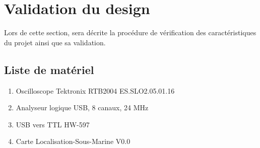 \section{Validation du design}
Lors de cette section, sera décrite la procédure de vérification des caractéristiques du projet ainsi que sa validation.
\subsection{Liste de matériel} \label{ssec:ListeMateriel}
{
	\begin{enumerate}
		\item Oscilloscope Tektronix RTB2004 ES.SLO2.05.01.16 \label{enum:oscillo}
		\item Analyseur logique USB, 8 canaux, 24 MHz \label{enum:logicAnalyzer}
		\item USB vers TTL HW-597 \label{enum:USB-TTL}
		\item Carte Localisation-Sous-Marine V0.0 \label{enum:PCBL}
	\end{enumerate}
}


